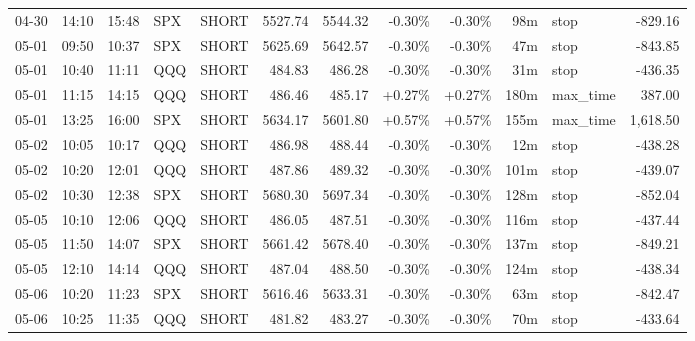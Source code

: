 \documentclass[11pt,a4paper]{article}
\begin{document}
\begin{center}
\begin{longtable}{>{\color{txtmain}}l l l l l r r r r r >{\color{txtmain}}l r}
04-30 & 14:10 & 15:48 & SPX & SHORT & 5527.74 & 5544.32 & \textcolor{lossred}{-0.30\%} & \textcolor{lossred}{-0.30\%} & 98m & stop & \textcolor{lossred}{-829.16} \\
05-01 & 09:50 & 10:37 & SPX & SHORT & 5625.69 & 5642.57 & \textcolor{lossred}{-0.30\%} & \textcolor{lossred}{-0.30\%} & 47m & stop & \textcolor{lossred}{-843.85} \\
05-01 & 10:40 & 11:11 & QQQ & SHORT & 484.83 & 486.28 & \textcolor{lossred}{-0.30\%} & \textcolor{lossred}{-0.30\%} & 31m & stop & \textcolor{lossred}{-436.35} \\
05-01 & 11:15 & 14:15 & QQQ & SHORT & 486.46 & 485.17 & \textcolor{wingreen}{+0.27\%} & \textcolor{wingreen}{+0.27\%} & 180m & max\_time & \textcolor{wingreen}{387.00} \\
05-01 & 13:25 & 16:00 & SPX & SHORT & 5634.17 & 5601.80 & \textcolor{wingreen}{+0.57\%} & \textcolor{wingreen}{+0.57\%} & 155m & max\_time & \textcolor{wingreen}{1,618.50} \\
05-02 & 10:05 & 10:17 & QQQ & SHORT & 486.98 & 488.44 & \textcolor{lossred}{-0.30\%} & \textcolor{lossred}{-0.30\%} & 12m & stop & \textcolor{lossred}{-438.28} \\
05-02 & 10:20 & 12:01 & QQQ & SHORT & 487.86 & 489.32 & \textcolor{lossred}{-0.30\%} & \textcolor{lossred}{-0.30\%} & 101m & stop & \textcolor{lossred}{-439.07} \\
05-02 & 10:30 & 12:38 & SPX & SHORT & 5680.30 & 5697.34 & \textcolor{lossred}{-0.30\%} & \textcolor{lossred}{-0.30\%} & 128m & stop & \textcolor{lossred}{-852.04} \\
05-05 & 10:10 & 12:06 & QQQ & SHORT & 486.05 & 487.51 & \textcolor{lossred}{-0.30\%} & \textcolor{lossred}{-0.30\%} & 116m & stop & \textcolor{lossred}{-437.44} \\
05-05 & 11:50 & 14:07 & SPX & SHORT & 5661.42 & 5678.40 & \textcolor{lossred}{-0.30\%} & \textcolor{lossred}{-0.30\%} & 137m & stop & \textcolor{lossred}{-849.21} \\
05-05 & 12:10 & 14:14 & QQQ & SHORT & 487.04 & 488.50 & \textcolor{lossred}{-0.30\%} & \textcolor{lossred}{-0.30\%} & 124m & stop & \textcolor{lossred}{-438.34} \\
05-06 & 10:20 & 11:23 & SPX & SHORT & 5616.46 & 5633.31 & \textcolor{lossred}{-0.30\%} & \textcolor{lossred}{-0.30\%} & 63m & stop & \textcolor{lossred}{-842.47} \\
05-06 & 10:25 & 11:35 & QQQ & SHORT & 481.82 & 483.27 & \textcolor{lossred}{-0.30\%} & \textcolor{lossred}{-0.30\%} & 70m & stop & \textcolor{lossred}{-433.64} \\

\end{longtable}
\end{center}
\end{document}
